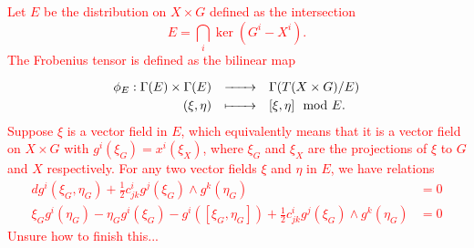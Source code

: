 \documentclass{../../templates/lkx_pset}
\begin{document}
\begin{parts}
	\textcolor{red}{
		Let $E$ be the distribution on $X\times G$ defined as the intersection
		\[
			E = \mathop{\bigcap}_i \ker (G^i - X^i).
		\]
		The Frobenius tensor is defined as the bilinear map
		\[
			\definefunction{\phi_E}{\Gamma(E)\times \Gamma(E)}{\Gamma(T(X\times G)/E)}{(\xi, \eta)}{[\xi,\eta]\mod E.}
		\]
		Suppose $\xi$ is a vector field in $E$, which equivalently means that it is a vector field on $X\times G$ with $g^i(\xi_G)=x^i(\xi_X)$, where $\xi_G$ and $\xi_X$ are the projections of $\xi$ to $G$ and $X$ respectively. For any two vector fields $\xi$ and $\eta$ in $E$, we have relations
		\[
			\begin{aligned}
				dg^i(\xi_G,\eta_G) + \frac{1}{2}c^i_{j k} g^j(\xi_G)\wedge g^k(\eta_G)
				                                                                                                                 & = 0 \\
				\xi_G g^i(\eta_G) - \eta_G g^i(\xi_G) - g^i([\xi_G, \eta_G]) + \frac{1}{2}c^i_{j k} g^j(\xi_G)\wedge g^k(\eta_G) & = 0
			\end{aligned}
		\]
		Unsure how to finish this...
	}
\end{parts}
\end{document}
